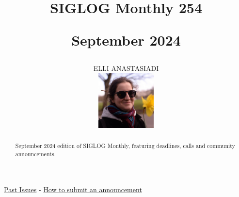 \documentclass[prodmode,acmtecs]{acmsmall} %
\newcounter{colstart}
\begin{document}
\setcounter{colstart}{\thepage}

\title{{\huge\sc SIGLOG Monthly 254}

 September 2024}\author{ELLI ANASTASIADI\vspace*{-2.6cm}\begin{flushright}\includegraphics[width=30mm]{elli_anastasiadi.png}\end{flushright}}\begin{abstract}September 2024 edition of SIGLOG Monthly, featuring deadlines, calls and community announcements.
\end{abstract}


\maketitlee

\href{https://lics.siglog.org/newsletters/}{Past Issues}
 - 
\href{https://lics.siglog.org/newsletters/inst.html}{How to submit an announcement}
\end{document}
